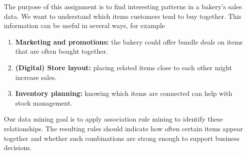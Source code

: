 \label{chap:business-understanding}

The purpose of this assignment is to find interesting patterns in a bakery's sales data. 
We want to understand which items customers tend to buy together. 
This information can be useful in several ways, for example\:

\begin{enumerate}
\item \textbf{Marketing and promotions:} 
the bakery could offer bundle deals on items that are often bought together.

\item \textbf{(Digital) Store layout:} 
placing related items close to each other might increase sales.

\item \textbf{Inventory planning:} 
knowing which items are connected can help with stock management.
\end{enumerate}

Our data mining goal is to apply association rule mining to identify these relationships. 
The resulting rules should indicate how often certain items appear together 
and whether such combinations are strong enough to support business decisions.
